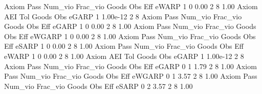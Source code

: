        Axiom {\VBAR} Pass     Num_vio    Frac_vio       Goods         Obs         Eff  
       eWARP {\VBAR}    1           0        0.00           2           8        1.00  
{\smallskip}
       Axiom {\VBAR}       AEI        Tol      Goods        Obs 
       eGARP {\VBAR}         1   1.00e-12          2          8 
{\smallskip}
{\smallskip}
{\smallskip}
       Axiom {\VBAR} Pass     Num_vio    Frac_vio       Goods         Obs         Eff  
       eGARP {\VBAR}    1           0        0.00           2           8        1.00  
{\smallskip}
{\smallskip}
{\smallskip}
       Axiom {\VBAR} Pass     Num_vio    Frac_vio       Goods         Obs         Eff  
      eWGARP {\VBAR}    1           0        0.00           2           8        1.00  
{\smallskip}
{\smallskip}
{\smallskip}
       Axiom {\VBAR} Pass     Num_vio    Frac_vio       Goods         Obs         Eff  
       eSARP {\VBAR}    1           0        0.00           2           8        1.00  
{\smallskip}
{\smallskip}
{\smallskip}
       Axiom {\VBAR} Pass     Num_vio    Frac_vio       Goods         Obs         Eff  
       eWARP {\VBAR}    1           0        0.00           2           8        1.00  
{\smallskip}
       Axiom {\VBAR}       AEI        Tol      Goods        Obs 
       eGARP {\VBAR}         1   1.00e-12          2          8 
{\smallskip}
{\smallskip}
{\smallskip}
       Axiom {\VBAR} Pass     Num_vio    Frac_vio       Goods         Obs         Eff  
       eGARP {\VBAR}    0           1        1.79           2           8        1.00  
{\smallskip}
{\smallskip}
{\smallskip}
       Axiom {\VBAR} Pass     Num_vio    Frac_vio       Goods         Obs         Eff  
      eWGARP {\VBAR}    0           1        3.57           2           8        1.00  
{\smallskip}
{\smallskip}
{\smallskip}
       Axiom {\VBAR} Pass     Num_vio    Frac_vio       Goods         Obs         Eff  
       eSARP {\VBAR}    0           2        3.57           2           8        1.00  
